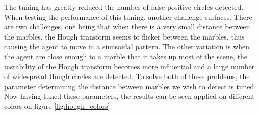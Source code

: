 \documentclass[../../../../main.tex]{subfiles}
\begin{document}
The tuning has greatly reduced the number of false positive circles detected. When testing the performance of this tuning, another challenge surfaces.
There are two challenges, one being that when there is a very small distance between the marbles, the Hough transform seems to flicker between the marbles, thus causing the agent to move in a sinusoidal pattern. The other variation is when the agent are close enough to a marble that it takes up most of the scene, the instability of the Hough transform becomes more influential and a large number of widespread Hough circles are detected. To solve both of these problems, the parameter determining the distance between marbles we wish to detect is tuned.\\
Now having tuned these parameters, the results can be seen applied on different colors on figure \ref{fig:hough_colors}.
\end{document}
